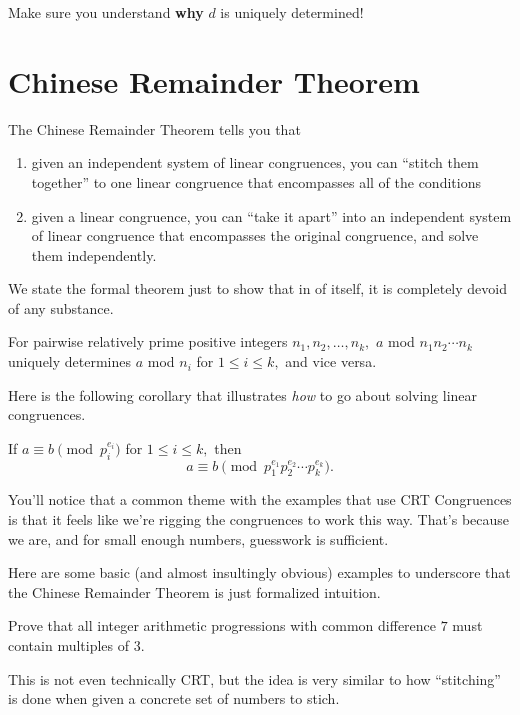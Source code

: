 \documentclass[mast]{lucky}
\begin{document}
Make sure you understand \textbf{why} $d$ is uniquely determined!

\section{Chinese Remainder Theorem}
The Chinese Remainder Theorem tells you that
\begin{enumerate}
\item given an independent system of linear congruences, you can ``stitch them together'' to one linear congruence that encompasses all of the conditions
\item given a linear congruence, you can ``take it apart'' into an independent system of linear congruence that encompasses the original congruence, and solve them independently.
\end{enumerate}

We state the formal theorem just to show that in of itself, it is completely devoid of any substance.

\begin{theo}
For pairwise relatively prime positive integers $n_1,n_2,\ldots,n_k,$ $a$ mod $n_1n_2\cdots n_k$ uniquely determines $a$ mod $n_i$ for $1\leq i\leq k,$ and vice versa.
\end{theo}

Here is the following corollary that illustrates \textit{how} to go about solving linear congruences.

\begin{fact}
If $a\equiv b\pmod{p_i^{e_i}}$ for $1\leq i\leq k,$ then
\[a\equiv b\pmod{p_1^{e_1}p_2^{e_2}\cdots p_k^{e_k}}.\]
\end{fact}

You'll notice that a common theme with the examples that use CRT Congruences is that it feels like we're rigging the congruences to work this way. That's because we are, and for small enough numbers, guesswork is sufficient.

Here are some basic (and almost insultingly obvious) examples to underscore that the Chinese Remainder Theorem is just formalized intuition.

\begin{exam}
Prove that all integer arithmetic progressions with common difference $7$ must contain multiples of $3.$
\end{exam}

This is not even technically CRT, but the idea is very similar to how ``stitching'' is done when given a concrete set of numbers to stich.
\end{document}
